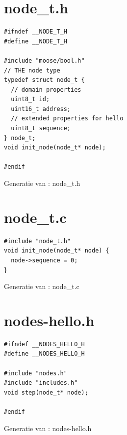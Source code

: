 \section{node\_t.h}
\vspace{-5mm}
\begin{listing}[H]
  \begin{verbatim}
#ifndef __NODE_T_H
#define __NODE_T_H

#include "moose/bool.h"
// THE node type
typedef struct node_t {
  // domain properties
  uint8_t id;
  uint16_t address;
  // extended properties for hello
  uint8_t sequence;
} node_t;
void init_node(node_t* node);

#endif
  \end{verbatim}
  \vspace{-5mm}
  \caption{Generatie van : node\_t.h}
\end{listing}

\section{node\_t.c}
\vspace{-5mm}
\begin{listing}[H]
  \begin{verbatim}
#include "node_t.h"
void init_node(node_t* node) {
  node->sequence = 0;
}
  \end{verbatim}
  \vspace{-5mm}
  \caption{Generatie van : node\_t.c}
\end{listing}

\section{nodes-hello.h}
\vspace{-5mm}
\begin{listing}[H]
  \begin{verbatim}
#ifndef __NODES_HELLO_H
#define __NODES_HELLO_H

#include "nodes.h"
#include "includes.h"
void step(node_t* node);

#endif
  \end{verbatim}
  \vspace{-5mm}
  \caption{Generatie van : nodes-hello.h}
\end{listing}

